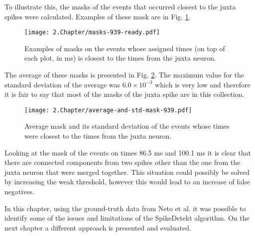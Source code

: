 To illustrate this, the masks of the events that occurred closest to the juxta spikes were calculated. Examples of these mask are in Fig. \ref{fig:masks-examples}.
 
\begin{figure}[!h]
	\centering
	\texttt{[image: 2.Chapter/masks-939-ready.pdf]}
	\caption{Examples of masks on the events whose assigned times (on top of each plot, in ms) is closest to the times from the juxta neuron.
}
\label{fig:masks-examples}
\end{figure}

The average of these masks is presented in Fig. \ref{fig:masks-average-std}. The maximum value for the standard deviation of the average was $6.0 \times 10^{-3}$ which is very low and therefore it is fair to say that most of the masks of the juxta spike are in this collection.

\begin{figure}[!h]
	\centering
	\texttt{[image: 2.Chapter/average-and-std-mask-939.pdf]}
	\caption{Average mask and its standard deviation of the events whose times were closest to the times from the juxta neuron.
}
\label{fig:masks-average-std}
\end{figure}


Looking at the mask of the events on times 86.5 ms  and 100.1 ms it is clear that there are connected components from two spikes other than the one from the juxta neuron that were merged together. This situation could possibly be solved by increasing the weak threshold, however this would lead to an increase of false negatives. 

In this chapter, using the ground-truth data from Neto et al. it was possible to identify some of the issues and limitations of the SpikeDetekt algorithm. On the next chapter a different approach is presented and evaluated.
